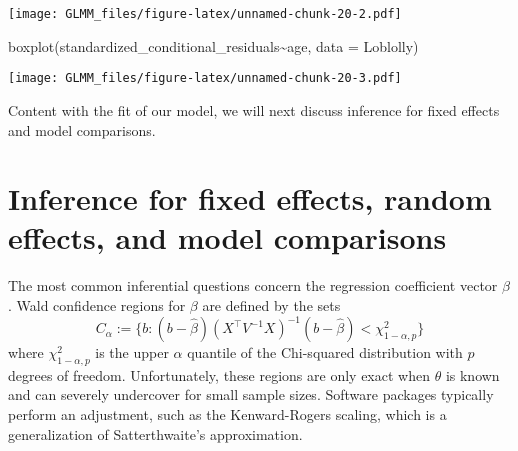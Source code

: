 \documentclass[
]{book}
\newenvironment{Shaded}{\begin{snugshade}}{\end{snugshade}}
\newcommand{\AttributeTok}[1]{\textcolor[rgb]{0.77,0.63,0.00}{#1}}
\newcommand{\DecValTok}[1]{\textcolor[rgb]{0.00,0.00,0.81}{#1}}
\newcommand{\FunctionTok}[1]{\textcolor[rgb]{0.00,0.00,0.00}{#1}}
\newcommand{\NormalTok}[1]{#1}
\newcommand{\OtherTok}[1]{\textcolor[rgb]{0.56,0.35,0.01}{#1}}
\newcommand{\SpecialCharTok}[1]{\textcolor[rgb]{0.00,0.00,0.00}{#1}}
\newcommand{\StringTok}[1]{\textcolor[rgb]{0.31,0.60,0.02}{#1}}
\begin{document}
\begin{Shaded}
\end{Shaded}

\texttt{[image: GLMM\_files/figure-latex/unnamed-chunk-20-2.pdf]}

\begin{Shaded}
\begin{Highlighting}[]
\FunctionTok{boxplot}\NormalTok{(standardized\_conditional\_residuals}\SpecialCharTok{\textasciitilde{}}\NormalTok{age, }\AttributeTok{data =}\NormalTok{ Loblolly)}
\end{Highlighting}
\end{Shaded}

\texttt{[image: GLMM\_files/figure-latex/unnamed-chunk-20-3.pdf]}

Content with the fit of our model, we will next discuss inference for fixed effects and model comparisons.

\hypertarget{inference-for-fixed-effects-random-effects-and-model-comparisons}{%
\section{Inference for fixed effects, random effects, and model comparisons}\label{inference-for-fixed-effects-random-effects-and-model-comparisons}}

The most common inferential questions concern the regression coefficient vector \(\beta\). Wald confidence regions for \(\beta\) are defined by the sets
\[C_\alpha := \{b: (b - \hat\beta)(X^\top V^{-1}X)^{-1}(b - \hat\beta)<\chi^2_{1-\alpha, p}\}\]
where \(\chi^2_{1-\alpha, p}\) is the upper \(\alpha\) quantile of the Chi-squared distribution with \(p\) degrees of freedom. Unfortunately, these regions are only exact when \(\theta\) is known and can severely undercover for small sample sizes. Software packages typically perform an adjustment, such as the Kenward-Rogers scaling, which is a generalization of Satterthwaite's approximation.
\end{document}
